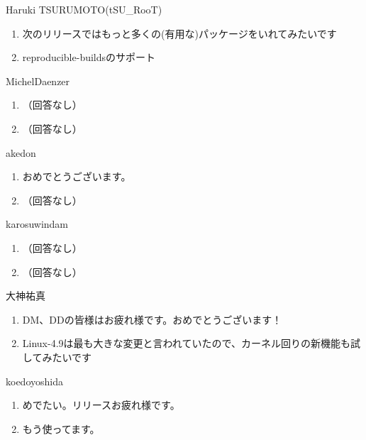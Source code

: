 \begin{prework}{ Haruki TSURUMOTO(tSU\_RooT) }
  \begin{enumerate}
  \item 次のリリースではもっと多くの(有用な)パッケージをいれてみたいです
  \item reproducible-buildsのサポート
  \end{enumerate}
\end{prework}

\begin{prework}{ MichelDaenzer }
  \begin{enumerate}
  \item （回答なし）
  \item （回答なし）
  \end{enumerate}
\end{prework}

\begin{prework}{ akedon }
  \begin{enumerate}
  \item おめでとうございます。
  \item （回答なし）
  \end{enumerate}
\end{prework}

\begin{prework}{ karosuwindam }
  \begin{enumerate}
  \item （回答なし）
  \item （回答なし）
  \end{enumerate}
\end{prework}

\begin{prework}{ 大神祐真 }
  \begin{enumerate}
  \item DM、DDの皆様はお疲れ様です。おめでとうございます！
  \item Linux-4.9は最も大きな変更と言われていたので、カーネル回りの新機能も試してみたいです
  \end{enumerate}
\end{prework}

\begin{prework}{ koedoyoshida }
  \begin{enumerate}
  \item めでたい。リリースお疲れ様です。
  \item もう使ってます。
  \end{enumerate}
\end{prework}


